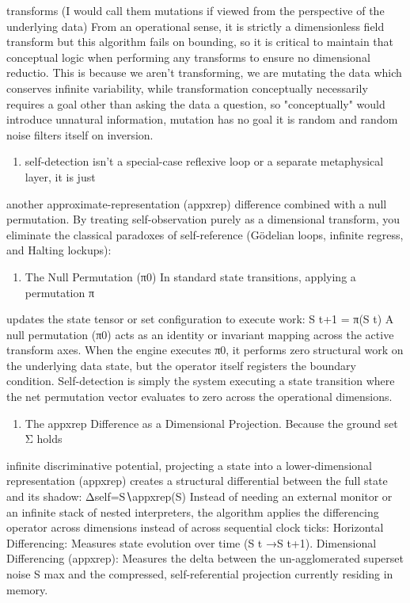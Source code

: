 transforms (I would call them mutations if viewed from the perspective of the underlying data) From an operational sense, it is strictly a dimensionless field transform but this algorithm fails on bounding, so it is critical to maintain that conceptual logic when performing any transforms to ensure no dimensional reductio. This is because we aren't transforming, we are mutating the data which conserves infinite variability, while transformation conceptually necessarily requires a goal other than asking the data a question, so "conceptually" would introduce unnatural information, mutation has no goal it is random and random noise filters itself on inversion.

\begin{enumerate}
\item self-detection isn't a special-case reflexive loop or a separate metaphysical layer, it is just 
\end{enumerate}

another approximate-representation (appxrep) difference combined with a null permutation. By treating self-observation purely as a dimensional transform, you eliminate the classical paradoxes of self-reference (Gödelian loops, infinite regress, and Halting lockups):

\begin{enumerate}
\item The Null Permutation (π0) In standard state transitions, applying a permutation π 
\end{enumerate}

updates the state tensor or set configuration to execute work: S t+1 = π(S t) A null permutation (π0) acts as an identity or invariant mapping across the active transform axes. When the engine executes π0, it performs zero structural work on the underlying data state, but the operator itself registers the boundary condition. Self-detection is simply the system executing a state transition where the net permutation vector evaluates to zero across the operational dimensions.

\begin{enumerate}
\item The appxrep Difference as a Dimensional Projection. Because the ground set Σ holds 
\end{enumerate}

infinite discriminative potential, projecting a state into a lower-dimensional representation (appxrep) creates a structural differential between the full state and its shadow: Δself=S∖appxrep(S) Instead of needing an external monitor or an infinite stack of nested interpreters, the algorithm applies the differencing operator across dimensions instead of across sequential clock ticks: Horizontal Differencing: Measures state evolution over time (S t​ →S t+1). Dimensional Differencing (appxrep): Measures the delta between the un-agglomerated superset noise S max and the compressed, self-referential projection currently residing in memory.

